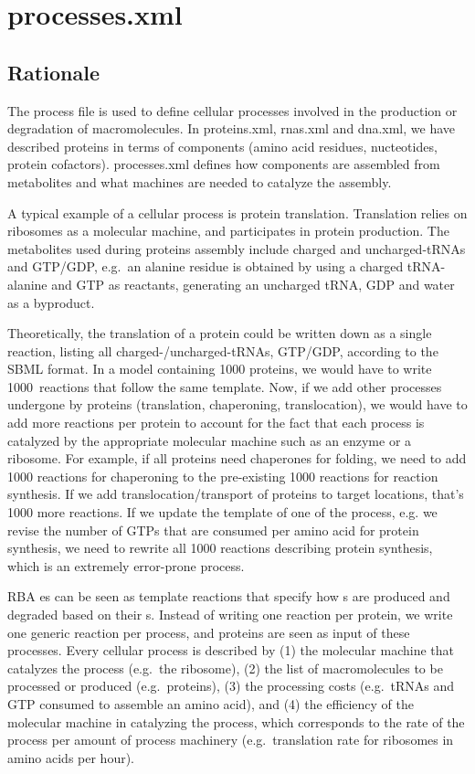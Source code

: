 
\section{processes.xml}

\subsection{Rationale}

The process file is used to define cellular processes involved in
the production or degradation of macromolecules.
In proteins.xml, rnas.xml and dna.xml, we have described proteins in terms of
components (amino acid residues, nucteotides, protein cofactors).
processes.xml defines how components are assembled from metabolites and
what machines are needed to catalyze the assembly.

A typical example of a cellular process is protein translation.
Translation relies on ribosomes as a molecular machine,
and participates in protein production.
The metabolites used during proteins assembly include
charged and uncharged-tRNAs and GTP/GDP,
e.g.\ an alanine residue is obtained by using a charged tRNA-alanine and GTP as
reactants, generating an uncharged tRNA, GDP and water as a byproduct.

Theoretically, the translation of a protein could be written down as a single reaction,
listing all charged-/uncharged-tRNAs, GTP/GDP, according to the SBML format.
In a model containing 1000 proteins, we would have to write 1000 reactions
that follow the same template.
Now, if we add other processes undergone by proteins
(translation, chaperoning, translocation),
we would have to add more reactions per protein to account for the fact that each
process is catalyzed by the appropriate molecular machine such as an enzyme or a ribosome.
For example, if all proteins need chaperones for folding,
we need to add 1000 reactions for chaperoning to the pre-existing
1000 reactions for reaction synthesis.
If we add translocation/transport of proteins to target locations,
that's 1000 more reactions.
If we update the template of one of the process,
e.g. we revise the number of GTPs that are consumed per amino acid for protein synthesis,
we need to rewrite all 1000 reactions describing protein synthesis,
which is an extremely error-prone process.

RBA \process{}es can be seen as template reactions that specify how
\macromolecule{}s are produced and degraded based on their \component{}s.
Instead of writing one reaction per protein,
we write one generic reaction per process,
and proteins are seen as input of these processes.
Every cellular process is described by
(1) the molecular machine that catalyzes the process (e.g.\ the ribosome),
(2) the list of macromolecules to be processed or produced (e.g.\ proteins),
(3) the processing costs (e.g.\ tRNAs and GTP consumed to assemble an amino acid), and
(4) the efficiency of the molecular machine in catalyzing the process,
which corresponds to the rate of the process per amount of process machinery
(e.g.\ translation rate for ribosomes in amino acids per hour).

